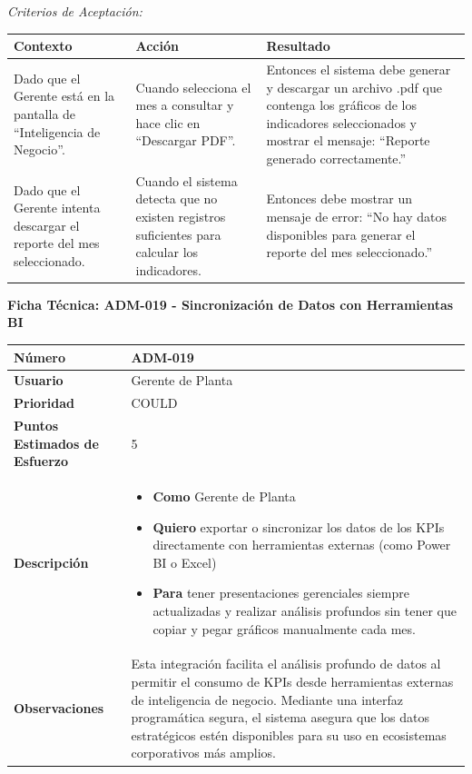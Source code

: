 \noindent\textit{Criterios de Aceptación:}
\footnotesize\begin{longtable}{|p{0.28\textwidth}|p{0.32\textwidth}|p{0.34\textwidth}|}\hline
\textbf{Contexto} & \textbf{Acción} & \textbf{Resultado} \\ \hline
\parbox[t]{\linewidth}{Dado que el Gerente está en la pantalla de ``Inteligencia de Negocio''.} & \parbox[t]{\linewidth}{Cuando selecciona el mes a consultar y hace clic en ``Descargar PDF''.} & \parbox[t]{\linewidth}{Entonces el sistema debe generar y descargar un archivo .pdf que contenga los gráficos de los indicadores seleccionados y mostrar el mensaje: ``Reporte generado correctamente.''} \\ \hline
\parbox[t]{\linewidth}{Dado que el Gerente intenta descargar el reporte del mes seleccionado.} & \parbox[t]{\linewidth}{Cuando el sistema detecta que no existen registros suficientes para calcular los indicadores.} & \parbox[t]{\linewidth}{Entonces debe mostrar un mensaje de error: ``No hay datos disponibles para generar el reporte del mes seleccionado.''} \\ \hline
\end{longtable}\normalsize
\vspace{1em}
\noindent\textbf{Ficha Técnica: ADM-019 - Sincronización de Datos con Herramientas BI}
\footnotesize\setlength{\tabcolsep}{4pt}\renewcommand{\arraystretch}{1.2}
\begin{longtable}{|p{0.21\textwidth}|p{0.74\textwidth}|}\hline
\textbf{Número} & ADM-019 \\ \hline
\textbf{Usuario} & Gerente de Planta \\ \hline
\textbf{Prioridad} & COULD \\ \hline
\textbf{Puntos Estimados de Esfuerzo} & 5 \\ \hline
\textbf{Descripción} & \parbox[t]{\linewidth}{\vspace{2pt}\begin{itemize}[leftmargin=1.5em, nosep, topsep=0pt]
\item \textbf{Como} Gerente de Planta
\item \textbf{Quiero} exportar o sincronizar los datos de los KPIs directamente con herramientas externas (como Power BI o Excel)
\item \textbf{Para} tener presentaciones gerenciales siempre actualizadas y realizar análisis profundos sin tener que copiar y pegar gráficos manualmente cada mes.
\end{itemize}\vspace{2pt}} \\ \hline
\textbf{Observaciones} & Esta integración facilita el análisis profundo de datos al permitir el consumo de KPIs desde herramientas externas de inteligencia de negocio. Mediante una interfaz programática segura, el sistema asegura que los datos estratégicos estén disponibles para su uso en ecosistemas corporativos más amplios. \\ \hline
\end{longtable}\normalsize
